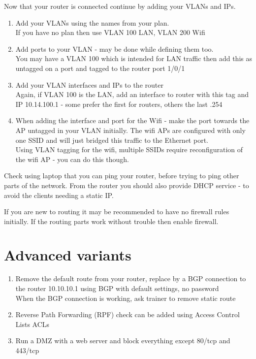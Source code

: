 \documentclass[a4paper,11pt,notitlepage]{report}
\begin{document}
Now that your router is connected continue by adding your VLANs and IPs.
\begin{enumerate}
\item Add your VLANs using the names from your plan.\\
If you have no plan then use VLAN 100 LAN, VLAN 200 Wifi
\item Add ports to your VLAN - may be done while defining them too.\\
You may have a VLAN 100 which is intended for LAN traffic then add this as untagged on a port and tagged to the router port 1/0/1
\item Add your VLAN interfaces and IPs to the router\\
Again, if VLAN 100 is the LAN, add an interface to router with this tag and IP 10.14.100.1 - some prefer the first for routers, others the last .254
\item When adding the interface and port for the Wifi - make the port towards the AP untagged in your VLAN initially. The wifi APs are configured with only one SSID and will just bridged this traffic to the Ethernet port.\\
Using VLAN tagging for the wifi, multiple SSIDs require reconfiguration of the wifi AP - you can do this though.
\end{enumerate}

Check using laptop that you can ping your router, before trying to ping other parts of the network. From the router you should also provide DHCP service - to avoid the clients needing a static IP.

If you are new to routing it may be recommended to have no firewall rules initially. If the routing parts work without trouble then enable firewall.

\section*{Advanced variants}
\begin{enumerate}
\item Remove the default route from your router, replace by a BGP connection to the router 10.10.10.1 using BGP with default settings, no password\\
When the BGP connection is working, ask trainer to remove static route
\item Reverse Path Forwarding (RPF) check can be added using Access Control Lists ACLs
\item Run a DMZ with a web server and block everything except 80/tcp and 443/tcp
\end{enumerate}
\end{document}
